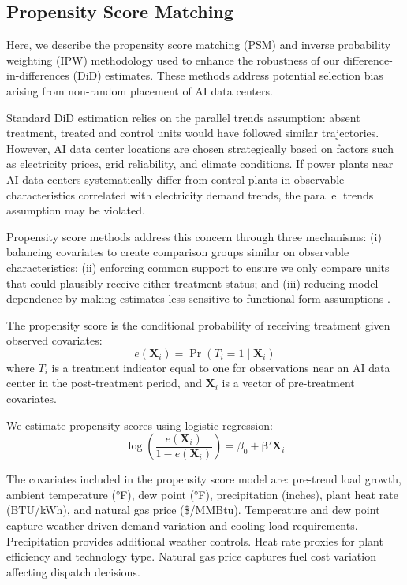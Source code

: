 \documentclass[a4paper,fleqn,longmktitle]{cas-sc}
\begin{document}
\subsection{Propensity Score Matching}

Here, we describe the propensity score matching (PSM) and inverse probability weighting (IPW) methodology used to enhance the robustness of our difference-in-differences (DiD) estimates. These methods address potential selection bias arising from non-random placement of AI data centers.

Standard DiD estimation relies on the parallel trends assumption: absent treatment, treated and control units would have followed similar trajectories. However, AI data center locations are chosen strategically based on factors such as electricity prices, grid reliability, and climate conditions. If power plants near AI data centers systematically differ from control plants in observable characteristics correlated with electricity demand trends, the parallel trends assumption may be violated.

Propensity score methods address this concern through three mechanisms: (i) balancing covariates to create comparison groups similar on observable characteristics; (ii) enforcing common support to ensure we only compare units that could plausibly receive either treatment status; and (iii) reducing model dependence by making estimates less sensitive to functional form assumptions \citep{rosenbaum1983central, hirano2003efficient}.

The propensity score is the conditional probability of receiving treatment given observed covariates:
\begin{equation}
    e(\mathbf{X}_i) = \Pr(T_i = 1 \mid \mathbf{X}_i)
\end{equation}
where $T_i$ is a treatment indicator equal to one for observations near an AI data center in the post-treatment period, and $\mathbf{X}_i$ is a vector of pre-treatment covariates.

We estimate propensity scores using logistic regression:
\begin{equation}
    \log\left(\frac{e(\mathbf{X}_i)}{1 - e(\mathbf{X}_i)}\right) = \beta_0 + \boldsymbol{\beta}'\mathbf{X}_i
\end{equation}

The covariates included in the propensity score model are: pre-trend load growth, ambient temperature (°F), dew point (°F), precipitation (inches), plant heat rate (\textnormal{BTU/kWh}), and natural gas price (\$/MMBtu). Temperature and dew point capture weather-driven demand variation and cooling load requirements. Precipitation provides additional weather controls. Heat rate proxies for plant efficiency and technology type. Natural gas price captures fuel cost variation affecting dispatch decisions.
\end{document}
